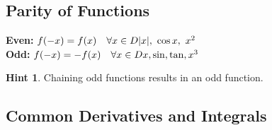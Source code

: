 \documentclass[a4paper, 10pt]{article}
\theoremstyle{definition}
\newtheorem*{note_wrapper}{Hint}
\theoremstyle{ex}
\theoremstyle{named}
\newenvironment{note}%
    {\begin{mdframed}[style=trick]\begin{note_wrapper}}%
    {\end{note_wrapper}\end{mdframed}}
\begin{document}
\subsection*{Parity of Functions}
\textbf{Even:} $f(-x) = f(x) \quad \forall x \in D \hfill |x|, \ \cos x, \ x^2$ \\
\textbf{Odd:} $f(-x) = -f(x) \quad \forall x \in D \hfill x, \sin, \tan, x^3$

\begin{note}
    Chaining odd functions results in an odd function.
\end{note}

\subsection*{Common Derivatives and Integrals}
\renewcommand{\arraystretch}{1.5}
\end{document}
